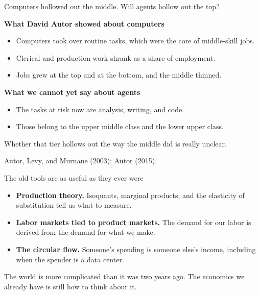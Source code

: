 \documentclass[aspectratio=169,11pt]{beamer}
\begin{document}
\begin{frame}{Computers hollowed out the middle. Will agents hollow out the top?}

\textbf{What David Autor showed about computers}
\begin{itemize}\setlength\itemsep{0.3em}
    \item Computers took over routine tasks, which were the core of middle-skill jobs.
    \item Clerical and production work shrank as a share of employment.
    \item Jobs grew at the top and at the bottom, and the middle thinned.
\end{itemize}

\vspace{0.3cm}

\textbf{What we cannot yet say about agents}
\begin{itemize}\setlength\itemsep{0.3em}
    \item The tasks at risk now are analysis, writing, and code.
    \item Those belong to the upper middle class and the lower upper class.
\end{itemize}

\vspace{0.3cm}

\alert{Whether that tier hollows out the way the middle did is really unclear.}

\vspace{0.05cm}
{\scriptsize\color{warmgray}Autor, Levy, and Murnane (2003); Autor (2015).}

\end{frame}

\begin{frame}{The old tools are as useful as they ever were}

\begin{itemize}\setlength\itemsep{0.5em}
    \item \textbf{Production theory.} Isoquants, marginal products, and the elasticity of substitution tell us what to measure.
    \item \textbf{Labor markets tied to product markets.} The demand for our labor is derived from the demand for what we make.
    \item \textbf{The circular flow.} Someone's spending is someone else's income, including when the spender is a data center.
\end{itemize}

\vspace{0.45cm}

\alert{The world is more complicated than it was two years ago. The economics we already have is still how to think about it.}

\end{frame}
\end{document}
